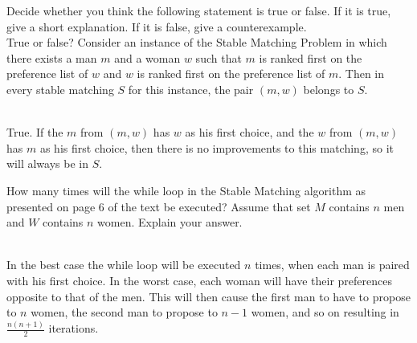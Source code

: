 \documentclass{assignment}
\begin{document}
\begin{problemlist}
\pbitem
\begin{problem}
Decide whether you think the following statement is true or false. If it is true, give a short explanation. If it is false, give a counterexample.\\
True or false? Consider an instance of the Stable Matching Problem in which there exists a man $m$ and a woman $w$ such that $m$ is ranked first on the preference list of $w$ and $w$ is ranked first on the preference list of $m$. Then in every stable matching $S$ for this instance, the pair $(m,w)$ belongs to $S$.
\end{problem}
\begin{answer}
\\True. If the $m$ from $(m,w)$ has $w$ as his first choice, and the $w$ from $(m,w)$ has $m$ as his first choice, then there is no improvements to this matching, so it will always be in $S$.
\end{answer}

\pbitem
\begin{problem}
How many times will the while loop in the Stable Matching algorithm as presented on page 6 of the text be executed? Assume that set $M$ contains $n$ men and $W$ contains $n$ women. Explain your answer.
\end{problem}
\begin{answer}
\\In the best case the while loop will be executed $n$ times, when each man is paired with his first choice. In the worst case, each woman will have their preferences opposite to that of the men. This will then cause the first man to have to propose to $n$ women, the second man to propose to $n-1$ women, and so on resulting in $\frac{n(n+1)}{2}$ iterations.
\end{answer}


\end{problemlist}
\end{document}
